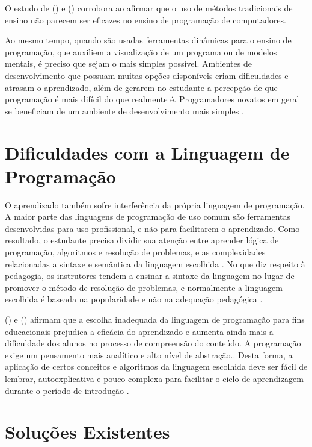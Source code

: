 O estudo de \citeauthor{bennedsencaspersen2005} (\citeyear{bennedsencaspersen2005}) e \citeauthor{zhangetall2013} (\citeyear{zhangetall2013}) corrobora ao afirmar que o uso de métodos tradicionais de ensino não parecem ser eficazes no ensino de programação de computadores.
	
Ao mesmo tempo, quando são usadas ferramentas dinâmicas para o ensino de programação, que auxiliem a visualização de um programa ou de modelos mentais, é preciso que sejam o mais simples possível. Ambientes de desenvolvimento que possuam muitas opções disponíveis criam dificuldades e atrasam o aprendizado, além de gerarem no estudante a percepção de que programação é mais difícil do que realmente é. Programadores novatos em geral se beneficiam de um ambiente de desenvolvimento mais simples \cite{MasonCooper2013, robins2019}.


\section{Dificuldades com a Linguagem de Programação}

O aprendizado também sofre interferência da própria linguagem de programação. A maior parte das linguagens de programação de uso comum são ferramentas desenvolvidas para uso profissional, e não para facilitarem o aprendizado. Como resultado, o estudante precisa dividir sua atenção entre aprender lógica de programação, algoritmos e resolução de problemas, e as complexidades relacionadas a sintaxe e semântica da linguagem escolhida \cite{gomesmendes2007}. No que diz respeito à pedagogia, os instrutores tendem a ensinar a sintaxe da linguagem no lugar de promover o método de resolução de problemas, e normalmente a linguagem escolhida é baseada na popularidade e não na adequação pedagógica \cite{gomesmendes2007}.

\citeauthor{brownwilson2018} (\citeyear{brownwilson2018}) e \citeauthor{savagepiwek2019} (\citeyear{savagepiwek2019}) afirmam que a escolha inadequada da linguagem de programação para fins educacionais prejudica a eficácia do aprendizado e aumenta ainda mais a dificuldade dos alunos no processo de compreensão do conteúdo. A programação exige um pensamento mais analítico e alto nível de abstração.. Desta forma, a aplicação de certos conceitos e algoritmos da linguagem escolhida deve ser fácil de lembrar, autoexplicativa e pouco complexa para facilitar o ciclo de aprendizagem durante o período de introdução \cite{gomesmendes2007, robins2019}.

\section{Soluções Existentes}
	
